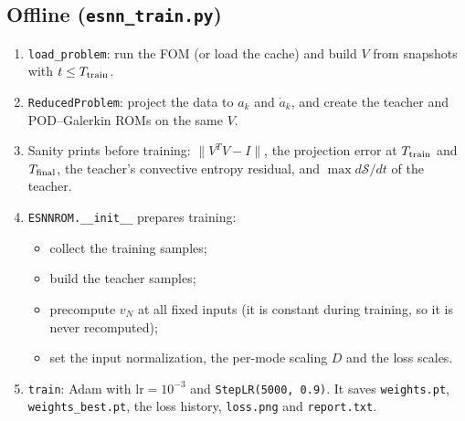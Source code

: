 \documentclass[11pt,a4paper]{article}
\newcommand{\code}[1]{\texttt{\small #1}}
\newcommand{\Sc}{\mathcal S}
\begin{document}
\subsection{Offline (\code{esnn\_train.py})}
\begin{enumerate}
\item \code{load\_problem}: run the FOM (or load the cache) and build $V$ from snapshots with $t\le T_{\rm train}$.
\item \code{ReducedProblem}: project the data to $a_k$ and $\dot a_k$, and create the teacher and POD--Galerkin ROMs on the same $V$.
\item Sanity prints before training: $\|V^TV-I\|$, the projection error at $T_{\rm train}$ and $T_{\rm final}$, the teacher's convective entropy residual, and $\max d\Sc/dt$ of the teacher.
\item \code{ESNNROM.\_\_init\_\_} prepares training:
  \begin{itemize}
  \item collect the training samples;
  \item build the teacher samples;
  \item precompute $v_N$ at all fixed inputs (it is constant during training, so it is never recomputed);
  \item set the input normalization, the per-mode scaling $D$ and the loss scales.
  \end{itemize}
\item \code{train}: Adam with $\mathrm{lr}=10^{-3}$ and \code{StepLR(5000, 0.9)}. It saves \code{weights.pt}, \code{weights\_best.pt}, the loss history, \code{loss.png} and \code{report.txt}.
\end{enumerate}
\end{document}
